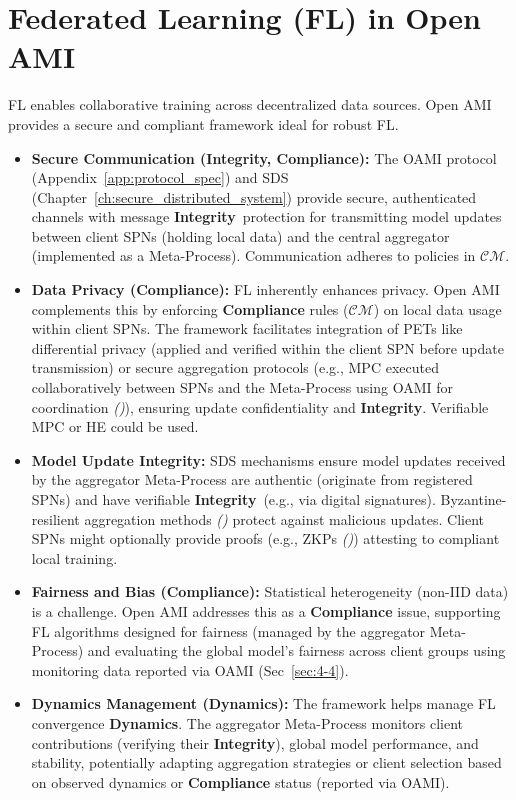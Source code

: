 \documentclass[12pt,a4paper]{report}
\renewcommand{\citep}[1]{\textit{\scriptsize{(\cite{#1})}}}
\newcommand{\Compliance}{\textbf{Compliance}}
\newcommand{\Integrity}{\textbf{Integrity}}
\newcommand{\Dynamics}{\textbf{Dynamics}}
\begin{document}
	\section{Federated Learning (FL) in Open AMI} %
	\label{sec:3-7}
	
	FL enables collaborative training across decentralized data sources. Open AMI provides a secure and compliant framework ideal for robust FL.
	
	\begin{itemize}
		\item \textbf{Secure Communication (\Integrity, Compliance):} The OAMI protocol (Appendix~\ref{app:protocol_spec}) and SDS (Chapter~\ref{ch:secure_distributed_system}) provide secure, authenticated channels with message \Integrity\ protection for transmitting model updates between client SPNs (holding local data) and the central aggregator (implemented as a Meta-Process). Communication adheres to policies in $\mathcal{CM}$.
		\item \textbf{Data Privacy (\Compliance):} FL inherently enhances privacy. Open AMI complements this by enforcing \textbf{Compliance} rules ($\mathcal{CM}$) on local data usage within client SPNs. The framework facilitates integration of PETs like differential privacy (applied and verified within the client SPN before update transmission) or secure aggregation protocols (e.g., MPC executed collaboratively between SPNs and the Meta-Process using OAMI for coordination \citep{AdditionalCitationRef54}), ensuring update confidentiality and \Integrity. Verifiable MPC or HE could be used.
		\item \textbf{Model Update Integrity:} SDS mechanisms ensure model updates received by the aggregator Meta-Process are authentic (originate from registered SPNs) and have verifiable \Integrity\ (e.g., via digital signatures). Byzantine-resilient aggregation methods \citep{Karimireddy2021Byzantine} protect against malicious updates. Client SPNs might optionally provide proofs (e.g., ZKPs \citep{Peng2025ZKMLSurvey}) attesting to compliant local training.
		\item \textbf{Fairness and Bias (\Compliance):} Statistical heterogeneity (non-IID data) is a challenge. Open AMI addresses this as a \textbf{Compliance} issue, supporting FL algorithms designed for fairness (managed by the aggregator Meta-Process) and evaluating the global model's fairness across client groups using monitoring data reported via OAMI (Sec~\ref{sec:4-4}).
		\item \textbf{Dynamics Management (\Dynamics):} The framework helps manage FL convergence \Dynamics. The aggregator Meta-Process monitors client contributions (verifying their \Integrity), global model performance, and stability, potentially adapting aggregation strategies or client selection based on observed dynamics or \textbf{Compliance} status (reported via OAMI).
	\end{itemize}
	
\end{document}
